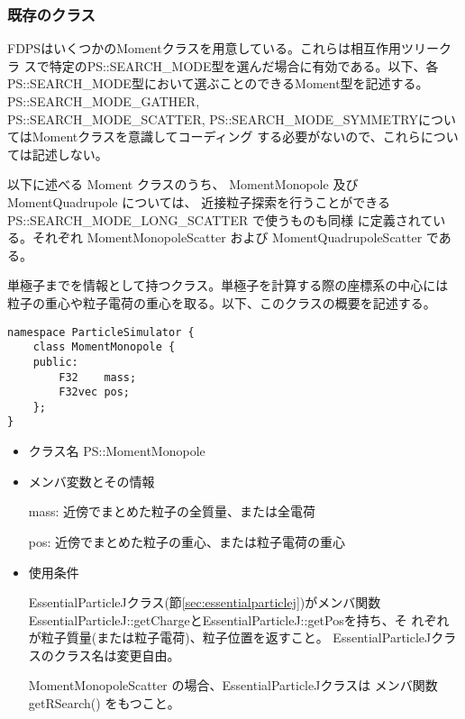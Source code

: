 \subsubsection{既存のクラス}


FDPSはいくつかのMomentクラスを用意している。これらは相互作用ツリークラ
スで特定のPS::SEARCH\_MODE型を選んだ場合に有効である。以下、各
PS::SEARCH\_MODE型において選ぶことのできるMoment型を記述する。
PS::SEARCH\_MODE\_GATHER, \\PS::SEARCH\_MODE\_SCATTER,
PS::SEARCH\_MODE\_SYMMETRYについてはMomentクラスを意識してコーディング
する必要がないので、これらについては記述しない。

\label{sec:MomentForSearchModeLong}
以下に述べる Moment クラスのうち、
MomentMonopole 及び  MomentQuadrupole については、
近接粒子探索を行うことができる PS::SEARCH\_MODE\_LONG\_SCATTER で使うものも同様
に定義されている。それぞれ MomentMonopoleScatter および
MomentQuadrupoleScatter である。



単極子までを情報として持つクラス。単極子を計算する際の座標系の中心には
粒子の重心や粒子電荷の重心を取る。以下、このクラスの概要を記述する。
\begin{screen}
\begin{verbatim}
namespace ParticleSimulator {
    class MomentMonopole {
    public:
        F32    mass;
        F32vec pos;
    };
}
\end{verbatim}
\end{screen}

\begin{itemize}
\item クラス名
  PS::MomentMonopole

\item メンバ変数とその情報

  mass: 近傍でまとめた粒子の全質量、または全電荷

  pos: 近傍でまとめた粒子の重心、または粒子電荷の重心

\item 使用条件

  EssentialParticleJクラス(節\ref{sec:essentialparticlej})がメンバ関数
  EssentialParticleJ::getChargeとEssentialParticleJ::getPosを持ち、そ
  れぞれが粒子質量(または粒子電荷)、粒子位置を返すこと。
  EssentialParticleJクラスのクラス名は変更自由。

  MomentMonopoleScatter の場合、EssentialParticleJクラスは
  メンバ関数 getRSearch() をもつこと。

\end{itemize}

